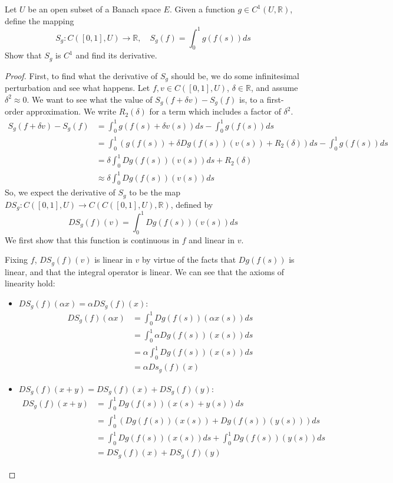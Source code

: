 \documentclass[12pt]{article}
\newcommand{\R}{\mathbb{R}}
\theoremstyle{definition}
\newenvironment{problem}[2][Problem]{\begin{trivlist}
\item[\hskip \labelsep {\bfseries #1}\hskip \labelsep {\bfseries #2.}]}{\end{trivlist}}
\begin{document}
\begin{problem}{4}
Let $U$ be an open subset of a Banach space $E$. Given a function $g \in C^1(U, \R)$, define the mapping
\[
S_g : C([0,1], U) \longrightarrow \R, \quad S_g(f) = \int_0^1 g(f(s)) ds
\]
Show that $S_g$ is $C^1$ and find its derivative.
\begin{proof}
First, to find what the derivative of $S_g$ should be, we do some infinitesimal perturbation and see what happens. Let $f, v \in C([0,1],U)$, $ \delta \in \R$, and assume $\delta^2 \approx 0$. We want to see what the value of $S_g(f + \delta v) - S_g(f)$ is, to a first-order approximation. We write $R_2(\delta)$ for a term which includes a factor of $\delta^2$.
\begin{align*}
    S_g(f + \delta v) - S_g(f) &= \int_0^1 g(f(s) + \delta v(s)) ds - \int_0^1 g(f(s)) ds\\
    &= \int_0^1 \left ( g(f(s)) + \delta Dg(f(s))(v(s)) + R_2(\delta) \right ) ds - \int_0^1 g(f(s)) ds\\
    &= \delta \int_0^1 Dg(f(s))( v(s)) ds + R_2(\delta)\\
    &\approx \delta \int_0^1 Dg(f(s))( v(s)) ds
\end{align*}
 So, we expect the derivative of $S_g$ to be the map $DS_g : C([0,1], U) \to C(C([0,1], U), \R)$, defined by 
 \[
 DS_g(f)(v) = \int_0^1 Dg(f(s))(v(s)) ds
 \]
 We first show that this function is continuous in $f$ and linear in $v$.
 \par Fixing $f$, $DS_g(f)(v)$ is linear in $v$ by virtue of the facts that $Dg(f(s))$ is linear, and that the integral operator is linear. We can see that the axioms of linearity hold:
 \begin{itemize}
	 \item $DS_g(f)(\alpha x) = \alpha DS_g(f)(x)$: 
		 \begin{align*}
			 DS_g(f)(\alpha x) &= \int_0^1 Dg(f(s))(\alpha x(s)) ds\\
			 &= \int_0^1 \alpha Dg(f(s))(x(s))ds\\
			 &= \alpha \int_0^1 Dg(f(s))(x(s))ds\\
			 &= \alpha Ds_g(f)(x)
		 \end{align*}
	 \item $DS_g(f)(x + y) = DS_g(f)(x) + DS_g(f)(y)$:
		 \begin{align*}
			 DS_g(f)(x + y) &= \int_0^1 Dg(f(s))(x(s) + y(s))ds\\
			 &= \int_0^1 (Dg(f(s))(x(s)) + Dg(f(s))(y(s)))ds\\
			 &= \int_0^1 Dg(f(s))(x(s))ds + \int_0^1 Dg(f(s))(y(s))ds\\
			 &= DS_g(f)(x) + DS_g(f)(y)
		 \end{align*}
		 

\end{itemize}
\end{proof}
\end{problem}
\end{document}
